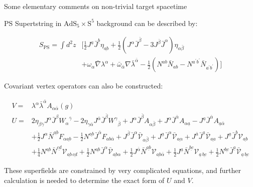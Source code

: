 \documentclass{beamer}
\begin{document}
\begin{frame}{Some elementary comments on non-trivial target spacetime}

	PS Supertstring in $\text{AdS}_{5}\times\text{S}^5$ background can be described by:
	\begin{small}
		\begin{equation*}
		\begin{aligned}
			S_{\text{PS}}=\int d^{2}z&\Bigg[\frac{1}{2}J^{\underline{a}}\bar{J}^{\underline{b}}\eta_{\underline{ab}}+\frac{1}{2}(J^{\alpha}\bar{J}^{\bar{\beta}}-3J^{\bar{\beta}}\bar{J}^{\alpha})\eta_{\alpha\bar{\beta}}\\
			&+\omega_{\alpha}\bar{\nabla}\lambda^{\alpha}+\bar{\omega}_{\bar{\alpha}}\nabla\bar{\lambda}^{\bar{\alpha}}-\frac{1}{2}(N^{ab}\bar{N}_{ab}-N^{a^{\prime}b^{\prime}}\bar{N}_{a^{\prime}b^{\prime}})\Bigg]
		\end{aligned}
	\end{equation*}
	\end{small}
	Covariant vertex operators can also be constructed: \cite{Chandia:2017afc}
	\begin{footnotesize}
		\begin{equation*}
		\begin{aligned}
			V=&\lambda^\alpha\bar{\lambda}^{\bar{\alpha}}A_{\alpha\bar{\alpha}}(g)\\
			U=&2\eta_{\beta\bar{\gamma}}J^{\alpha}\bar{J}^{\beta}{W_{\alpha}}^{\bar{\gamma}}-2\eta_{\gamma\bar{\alpha}}J^{\bar{\alpha}}\bar{J}^{\bar{\beta}}{W^{\gamma}}_{\bar{\beta}}+J^{\alpha}\bar{J}^{\bar{\beta}}A_{\alpha\bar{\beta}}+J^{\alpha}\bar{J}^{\bar{\alpha}}A_{\alpha\underline{a}}-J^{\underline{a}}\bar{J}^{\bar{\alpha}}A_{\underline{a}\bar{\alpha}}\\
			&+\frac{1}{2}J^{\alpha}\bar{N}^{\underline{ab}}F_{\alpha\underline{ab}}-\frac{1}{2}N^{\underline{ab}}\bar{J}^{\bar{\alpha}}F_{ab\bar{\alpha}}+J^{\bar{\beta}}\bar{J}^{\alpha}\bar{\mathcal{V}}_{\alpha\bar{\beta}}+J^{\underline{a}}\bar{J}^{\alpha}\bar{\mathcal{V}}_{\underline{a\alpha}}+J^{\bar{a}}\bar{J}^{\underline{a}}\bar{\mathcal{V}}_{\underline{aa}}+J^{\underline{a}}\bar{J}^{\underline{b}}\mathcal{V}_{\underline{ab}}\\
			&+\frac{1}{4}N^{\underline{ab}}\bar{N}^{\underline{cd}}\mathcal{V}_{\underline{ab}\,\underline{cd}}+\frac{1}{2}N^{\underline{ab}}\bar{J}^{\alpha}\bar{\mathcal{V}}_{\underline{ab}\alpha}+\frac{1}{2}J^{\bar{\alpha}}\bar{N}^{\underline{ab}}\mathcal{V}_{\underline{ab}\bar{\alpha}}+\frac{1}{2}J^{\underline{a}}\bar{N}^{\underline{bc}}\mathcal{V}_{\underline{a}\,\underline{bc}}+\frac{1}{2}N^{\underline{bc}}\bar{J}^{\underline{a}}\bar{\mathcal{V}}_{\underline{a}\,\underline{bc}}
		\end{aligned}
	\end{equation*}
	\end{footnotesize}
	These superfields are constrained by very complicated equations, and further calculation is needed to determine the exact form of $U$ and $V$.
\end{frame}
\end{document}
